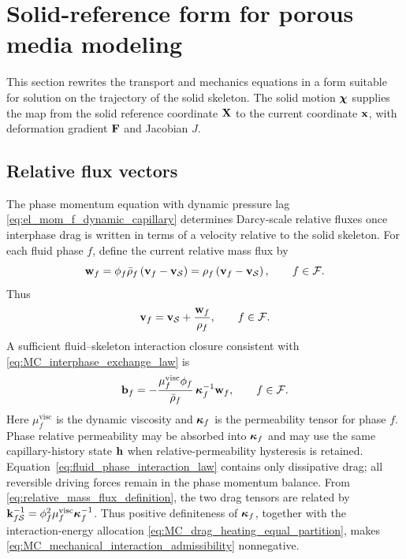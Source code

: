 \section{Solid-reference form for porous media modeling}
\label{sec:reservoir_simulation}

This section rewrites the transport and mechanics equations in a form suitable
for solution on the trajectory of the solid skeleton.  The solid motion
$\boldsymbol{\chi}$ supplies the map from the solid reference coordinate
$\mathbf{X}$ to the current coordinate $\mathbf{x}$, with deformation gradient
$\mathbf{F}$ and Jacobian $J$.

\subsection{Relative flux vectors}
\label{sec:relative_flux_vectors}

The phase momentum equation with dynamic pressure lag
\eqref{eq:el_mom_f_dynamic_capillary} determines
Darcy-scale relative fluxes once interphase drag is written in terms of a
velocity relative to the solid skeleton.  For each fluid phase \(f\), define the
current relative mass flux by
%
\begin{equation}
	\mathbf{w}_f
	=\phi_f\bar\rho_f\left(\mathbf{v}_f-\mathbf{v}_{\mathcal{S}}\right)
	=\rho_f\left(\mathbf{v}_f-\mathbf{v}_{\mathcal{S}}\right),
	\qquad
	f\in\mathcal{F} .
	\label{eq:relative_mass_flux_definition}
\end{equation}
%
Thus
%
\begin{equation}
	\mathbf{v}_f
	=\mathbf{v}_{\mathcal{S}}+\frac{\mathbf{w}_f}{\rho_f},
	\qquad
	f\in\mathcal{F} .
	\label{eq:relative_flux_velocity_reconstruction}
\end{equation}
%
A sufficient fluid--skeleton interaction closure consistent with
\eqref{eq:MC_interphase_exchange_law} is
%
\begin{equation}
	\mathbf{b}_f
	=
	-\frac{\mu_f^{\mathrm{visc}}\phi_f}{\bar\rho_f}\,
	\boldsymbol{\kappa}_f^{-1}\mathbf{w}_f,
	\qquad
	f\in\mathcal{F} .
	\label{eq:fluid_phase_interaction_law}
\end{equation}
%
Here $\mu_f^{\mathrm{visc}}$ is the dynamic viscosity and $\boldsymbol{\kappa}_f$ is the
permeability tensor for phase $f$.  Phase relative permeability may be absorbed
into $\boldsymbol{\kappa}_f$ and may use the same capillary-history state \(\mathbf{h}\) when
relative-permeability hysteresis is retained.
Equation~\eqref{eq:fluid_phase_interaction_law} contains
only dissipative drag; all reversible driving forces remain in the phase
momentum balance.  From \eqref{eq:relative_mass_flux_definition}, the two drag
tensors are related by
\(\mathbf{k}_{f\mathcal{S}}^{-1}
=\phi_f^2\mu_f^{\mathrm{visc}}\boldsymbol{\kappa}_f^{-1}\).
Thus positive definiteness of \(\boldsymbol{\kappa}_f\), together with the
interaction-energy allocation
\eqref{eq:MC_drag_heating_equal_partition}, makes
\eqref{eq:MC_mechanical_interaction_admissibility} nonnegative.

